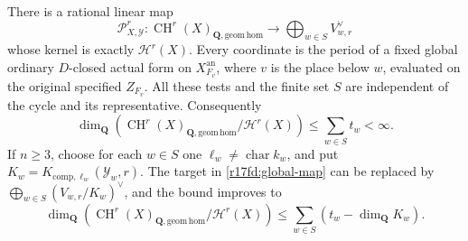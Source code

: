 \begin{theorem}
\label{r17fd:global-finite}
There is a rational linear map
\[
 \mathcal P^r_{X,\mathcal Y}:
 \operatorname{CH}^r(X)_{\mathbf Q,\mathrm{geom\,hom}}
             \longrightarrow\bigoplus_{w\in S}V_{w,r}^{\vee}
 \tag{FD17.14}\label{r17fd:global-map}
\]
whose kernel is exactly $\mathcal H^r(X)$.
Every coordinate is the period of a fixed global ordinary
$D$-closed actual form on $X_{F_v}^{\mathrm{an}}$, where
$v$ is the place below $w$, evaluated on the original
specified $Z_{F_v}$. All these tests and the finite set $S$
are independent of the cycle and its representative.
Consequently
\[
 \dim_{\mathbf Q}
 \left(\operatorname{CH}^r(X)_{\mathbf Q,\mathrm{geom\,hom}}
                         /\mathcal H^r(X)\right)
                  \le\sum_{w\in S}t_w<\infty.
 \tag{FD17.15}\label{r17fd:global-bound}
\]
If $n\ge3$, choose for each $w\in S$ one
$\ell_w\ne\operatorname{char}k_w$, and put
$K_w=K_{\mathrm{comp},\ell_w}(\mathcal Y_w,r)$.
The target in \eqref{r17fd:global-map} can be replaced by
$\bigoplus_{w\in S}(V_{w,r}/K_w)^\vee$, and the bound
improves to
\[
 \dim_{\mathbf Q}
 \left(\operatorname{CH}^r(X)_{\mathbf Q,\mathrm{geom\,hom}}
                         /\mathcal H^r(X)\right)
             \le\sum_{w\in S}(t_w-\dim_{\mathbf Q}K_w).
 \tag{FD17.16}\label{r17fd:global-refined-bound}
\]
\end{theorem}


